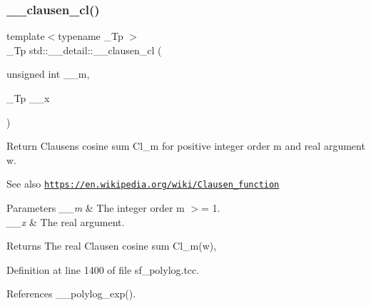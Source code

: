 \mbox{\label{namespacestd_1_1____detail_a523b5171a620d8816339c71994e67bb1}} 
\subsubsection{\texorpdfstring{\+\_\+\+\_\+clausen\+\_\+cl()}{\_\_clausen\_cl()}\hspace{0.1cm}{\footnotesize\ttfamily [2/2]}}
{\footnotesize\ttfamily template$<$typename \+\_\+\+Tp $>$ \\
\+\_\+\+Tp std\+::\+\_\+\+\_\+detail\+::\+\_\+\+\_\+clausen\+\_\+cl (\begin{DoxyParamCaption}\item[{unsigned int}]{\+\_\+\+\_\+m,  }\item[{\+\_\+\+Tp}]{\+\_\+\+\_\+x }\end{DoxyParamCaption})}

Return Clausen\textquotesingle{}s cosine sum Cl\+\_\+m for positive integer order m and real argument w. \begin{DoxySeeAlso}{See also}
\href{https://en.wikipedia.org/wiki/Clausen_function}{\tt https\+://en.\+wikipedia.\+org/wiki/\+Clausen\+\_\+function}
\end{DoxySeeAlso}

\begin{DoxyParams}{Parameters}
{\em \+\_\+\+\_\+m} & The integer order m $>$= 1. \\
\hline
{\em \+\_\+\+\_\+x} & The real argument. \\
\hline
\end{DoxyParams}
\begin{DoxyReturn}{Returns}
The real Clausen cosine sum Cl\+\_\+m(w), 
\end{DoxyReturn}


Definition at line 1400 of file sf\+\_\+polylog.\+tcc.



References \+\_\+\+\_\+polylog\+\_\+exp().

\mbox{\label{namespacestd_1_1____detail_ab7d250f236ef63ed8bd260881b73524d}} 
